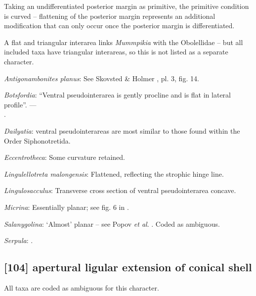 \documentclass[openany]{book}
\theoremstyle{definition}
\theoremstyle{definition}
\theoremstyle{definition}
\theoremstyle{remark}
\begin{document}
Taking an undifferentiated posterior margin as primitive, the primitive
condition is curved -- flattening of the posterior margin represents an
additional modification that can only occur once the posterior margin is
differentiated.

A flat and triangular interarea links \emph{Mummpikia} with the
Obolellidae \citep{Balthasar2008iMummpikia} -- but all included taxa
have triangular interareas, so this is not listed as a separate
character.

\hypertarget{Antigonambonites_planus-coding-103}{}
\emph{Antigonambonites planus}: See Skovsted \& Holmer
\citeyearpar{Skovsted2005EarlyCambrian}, pl. 3, fig. 14.

\hypertarget{Botsfordia-coding-103}{}
\emph{Botsfordia}: ``Ventral pseudointerarea is gently procline and is
flat in lateral profile''. ---\\
\citep{Topper2013Reappraisalof}.

\hypertarget{Dailyatia-coding-103}{}
\emph{Dailyatia}: ventral pseudointerareas are most similar to those
found within the Order Siphonotretida.

\hypertarget{Eccentrotheca-coding-103}{}
\emph{Eccentrotheca}: Some curvature retained.

\hypertarget{Lingulellotreta_malongensis-coding-103}{}
\emph{Lingulellotreta malongensis}: Flattened, reflecting the strophic
hinge line.

\hypertarget{Lingulosacculus-coding-103}{}
\emph{Lingulosacculus}: Transverse cross section of ventral
pseudointerarea concave.

\hypertarget{Micrina-coding-103}{}
\emph{Micrina}: Essentially planar; see fig. 6 in
\citet{Ushatinskaya2016Protegulumand}.

\hypertarget{Salanygolina-coding-103}{}
\emph{Salanygolina}: `Almost' planar -- see Popov \emph{et al}.
\citeyearpar[fig. 4]{Popov2009Earlyontogeny}. Coded as ambiguous.

\hypertarget{Serpula-coding-103}{}
\emph{Serpula}: \citep{Schwabe2010}.

\subsection*{{[}104{]} apertural ligular extension of conical
shell}\label{apertural-ligular-extension-of-conical-shell}

All taxa are coded as ambiguous for this character.
\end{document}
